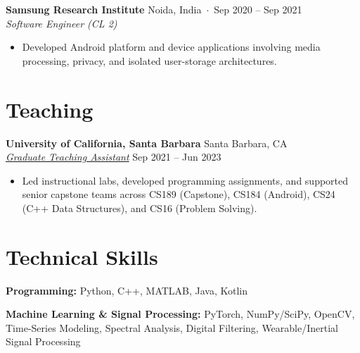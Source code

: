\documentclass[10pt,letterpaper]{article}
\begin{document}
\noindent
\textbf{Samsung Research Institute}
\hfill Noida, India
\,$\cdot$\,
Sep 2020 -- Sep 2021
\\
\textit{Software Engineer (CL 2)}

\begin{itemize}

    \item Developed Android platform and device applications involving
    media processing, privacy, and isolated user-storage architectures.

\end{itemize}


\section*{Teaching}

\noindent
\textbf{University of California, Santa Barbara}
\hfill Santa Barbara, CA
\\
\textit{
\href{https://satyam-aw.github.io/teaching/}
{Graduate Teaching Assistant}}
\hfill Sep 2021 -- Jun 2023

\begin{itemize}

    \item Led instructional labs, developed programming assignments,
    and supported senior capstone teams across
    CS189 (Capstone),
    CS184 (Android),
    CS24 (C++ Data Structures),
    and CS16 (Problem Solving).

\end{itemize}


\section*{Technical Skills}

\noindent
\textbf{Programming:}
Python, C++, MATLAB, Java, Kotlin

\medskip

\noindent
\textbf{Machine Learning \& Signal Processing:}
PyTorch, NumPy/SciPy, OpenCV,
Time-Series Modeling, Spectral Analysis, Digital Filtering,
Wearable/Inertial Signal Processing
\end{document}
